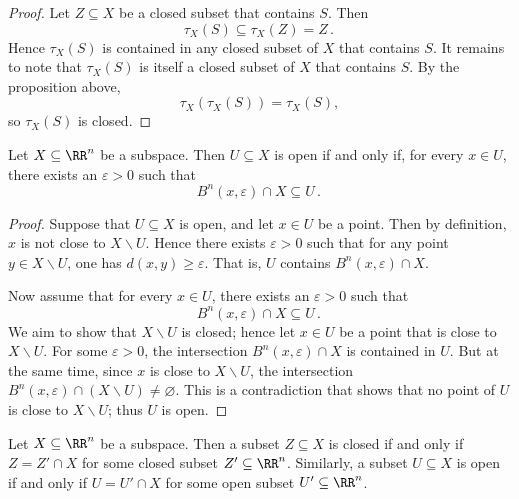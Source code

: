\begin{proof}
	Let $Z \subseteq X $ be a closed subset that contains $S$.
	Then
	\[
		\tau_X(S) \subseteq \tau_X(Z) = Z \period
	\]
	Hence $\tau_X(S)$ is contained in any closed subset of $X$ that contains $S$.
	It remains to note that $\tau_X(S)$ is itself a closed subset of $X$ that contains $S$.
	By the proposition above,
	\[
		\tau_X(\tau_X(S)) = \tau_X(S) \comma 
	\]
	so $\tau_X(S)$ is closed.
\end{proof}

\begin{prp}%
\label{prp:balls_form_a_basis}
	Let $ X \subseteq \RR^n $ be a subspace.
	Then $ U \subseteq X $ is open if and only if, for every $ x \in U$, there exists an $\varepsilon >0$ such that
	\[
		B^n(x, \varepsilon) \cap X \subseteq U \period
	\]
\end{prp}

\begin{proof}
	Suppose that $U \subseteq X $ is open, and let $ x \in U $ be a point.
	Then by definition, $x$ is not close to $ X \smallsetminus U $.
	Hence there exists $\varepsilon>0$ such that for any point $ y \in X \smallsetminus U $, one has $d(x,y) \geq \varepsilon$.
	That is, $U$ contains $B^n(x,\varepsilon) \cap X $.

	Now assume that for every $ x \in U$, there exists an $\varepsilon >0$ such that
	\[
		B^n(x, \varepsilon) \cap X \subseteq U \period
	\]
	We aim to show that $ X \smallsetminus U $ is closed;
	hence let $ x \in U $ be a point that is close to $ X \smallsetminus U $.
	For some $\varepsilon>0$, the intersection $B^n(x,\varepsilon) \cap X $ is contained in $U$.
	But at the same time, since $ x $ is close to $X \smallsetminus U$, the intersection $B^n(x, \varepsilon) \cap (X \smallsetminus U) \neq \varnothing$.
	This is a contradiction that shows that no point of $U$ is close to $X \smallsetminus U $;
	thus $U$ is open.
\end{proof}

\begin{prp}%
\label{prp:closeds_and_open_in_subspace_topology}
	Let $X \subseteq \RR^n$ be a subspace.
	Then a subset $Z \subseteq X $ is closed if and only if $Z = Z' \cap X $ for some closed subset $Z' \subseteq \RR^n$.
	Similarly, a subset $U \subseteq X $ is open if and only if $U = U' \cap X$ for some open subset $U' \subseteq \RR^n$.
\end{prp}

